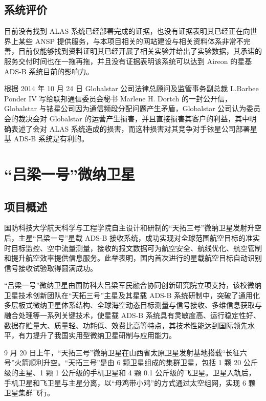 
\subsection{系统评价}

目前没有找到 ALAS 系统已经部署完成的证据，也没有证据表明其已经正在向世界上某些 ANSP 提供服务，与本项目相关的网站建设与相关资料体系非常不完善，目前仅能够找到资料证明其已经开展了相关实验并给出了实验数据，其承诺的服务交付时间也在一拖再拖，并且没有证据表明该系统可以达到 Aireon 的星基 ADS-B 系统目前的影响力。

根据 2014 年 10 月 24 日 Globalstar 公司法律总顾问及监管事务副总裁 L.Barbee Ponder IV 写给联邦通信委员会秘书 Marlene H. Dortch 的一封公开信，Globalstar 与铱星公司因为通信频段分配问题产生矛盾，Globalstar 公司认为委员会的裁决会对 Globalstar 的运营产生损害，并且直接损害其客户的利益，其中明确表述了会对 ALAS 系统造成的损害，而这种损害对其竞争对手铱星公司部署星基 ADS-B 系统是有利的。

\section{“吕梁一号”微纳卫星}

\subsection{项目概述\protect\footnotemark}


国防科技大学航天科学与工程学院自主设计和研制的“天拓三号”微纳卫星发射升空后，主星“吕梁一号”星载 ADS-B 接收系统，成功实现对全球范围航空目标的准实时目标监控、空中流量测量，接收的报文数据可为航空安全、航线优化、航空管制和提升航空效率提供信息服务。此举表明，国内首次进行的星载航空目标自动识别信号接收试验取得圆满成功。

“吕梁一号”微纳卫星由国防科大吕梁军民融合协同创新研究院立项支持，该校微纳卫星技术创新团队在“天拓三号”主星及其星载 ADS-B 系统研制中，突破了通用化多层板式微纳卫星体系结构、全球海空动态目标测量与信号接收、多维信息获取与融合处理等一系列关键技术，使星载 ADS-B 系统具有灵敏度高、运行稳定性好、数据存贮量大、质量轻、功耗低、效费比高等特点，其技术性能达到国际领先水平，有力提升了我国实用型微纳卫星研制与应用能力。

9 月 20 日上午，“天拓三号”微纳卫星在山西省太原卫星发射基地搭载“长征六号”火箭顺利升空。“天拓三号”是由 6 颗卫星组成的集群卫星，包括 1 颗 20 公斤级的主星、1 颗 1 公斤级的手机卫星和 4 颗 0.1 公斤级的飞卫星。卫星入轨后，手机卫星和飞卫星与主星分离，以“母鸡带小鸡”的方式通过太空组网，实现 6 颗卫星集群飞行。

